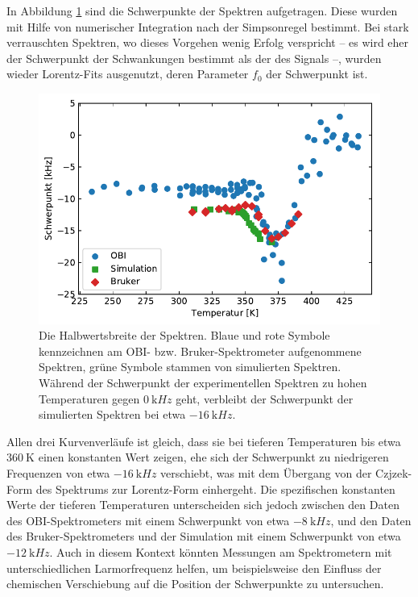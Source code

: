 \par\bigskip

In Abbildung \ref{fig:res:spek_mean} sind die Schwerpunkte der Spektren aufgetragen. Diese wurden mit Hilfe von numerischer Integration nach der Simpsonregel bestimmt. Bei stark verrauschten Spektren, wo dieses Vorgehen wenig Erfolg verspricht -- es wird eher der Schwerpunkt der Schwankungen bestimmt als der des Signals --, wurden wieder Lorentz-Fits ausgenutzt, deren Parameter $f_0$ der Schwerpunkt ist.
\begin{figure}
	\begin{center}
		\includegraphics[width=.9\textwidth]{graphics/plot/mean.pdf} 
	\end{center}
	\caption{Die Halbwertsbreite der Spektren. Blaue und rote Symbole kennzeichnen am OBI- bzw. Bruker-Spektrometer aufgenommene Spektren, grüne Symbole stammen von simulierten Spektren. Während der Schwerpunkt der experimentellen Spektren zu hohen Temperaturen gegen $\SI{0}{\kilo Hz}$ geht, verbleibt der Schwerpunkt der simulierten Spektren bei etwa $\SI{-16}{\kilo Hz}$.} \label{fig:res:spek_mean}
\end{figure}

Allen drei Kurvenverläufe ist gleich, dass sie bei tieferen Temperaturen bis etwa $\SI{360}{\kelvin}$ einen konstanten Wert zeigen, ehe sich der Schwerpunkt zu niedrigeren Frequenzen von etwa $\SI{-16}{\kilo Hz}$ verschiebt, was mit dem Übergang von der Czjzek-Form des Spektrums zur Lorentz-Form einhergeht. Die spezifischen konstanten Werte der tieferen Temperaturen unterscheiden sich jedoch zwischen den Daten des OBI-Spektrometers mit einem Schwerpunkt von etwa $\SI{-8}{\kilo Hz}$, und den Daten des Bruker-Spektrometers und der Simulation mit einem Schwerpunkt von etwa $\SI{-12}{\kilo Hz}$. Auch in diesem Kontext könnten Messungen am Spektrometern mit unterschiedlichen Larmorfrequenz helfen, um beispielsweise den Einfluss der chemischen Verschiebung auf die Position der Schwerpunkte zu untersuchen.

